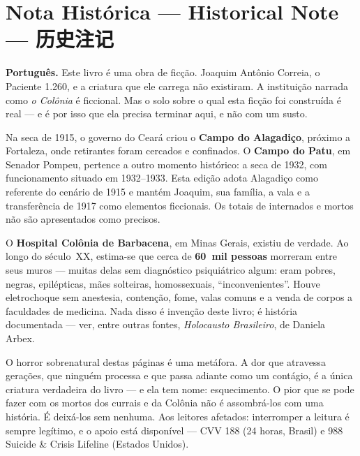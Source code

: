 \cleardoublepage
\chapter*{Nota Histórica --- Historical Note --- 历史注记}
\label{nota-historica}

\thispagestyle{empty}

\noindent\textbf{Português.} Este livro é uma obra de ficção. Joaquim Antônio Correia, o Paciente 1.260, e a criatura que ele carrega não existiram. A instituição narrada como \textit{o Colônia} é ficcional. Mas o solo sobre o qual esta ficção foi construída é real --- e é por isso que ela precisa terminar aqui, e não com um susto.

\vspace{0.6em}
\noindent Na seca de 1915, o governo do Ceará criou o \textbf{Campo do Alagadiço}, próximo a Fortaleza, onde retirantes foram cercados e confinados. O \textbf{Campo do Patu}, em Senador Pompeu, pertence a outro momento histórico: a seca de 1932, com funcionamento situado em 1932--1933. Esta edição adota Alagadiço como referente do cenário de 1915 e mantém Joaquim, sua família, a vala e a transferência de 1917 como elementos ficcionais. Os totais de internados e mortos não são apresentados como precisos.

\vspace{0.6em}
\noindent O \textbf{Hospital Colônia de Barbacena}, em Minas Gerais, existiu de verdade. Ao longo do século~XX, estima-se que cerca de \textbf{60~mil pessoas} morreram entre seus muros --- muitas delas sem diagnóstico psiquiátrico algum: eram pobres, negras, epilépticas, mães solteiras, homossexuais, ``inconvenientes''. Houve eletrochoque sem anestesia, contenção, fome, valas comuns e a venda de corpos a faculdades de medicina. Nada disso é invenção deste livro; é história documentada --- ver, entre outras fontes, \textit{Holocausto Brasileiro}, de Daniela Arbex.

\vspace{0.6em}
\noindent O horror sobrenatural destas páginas é uma metáfora. A dor que atravessa gerações, que ninguém processa e que passa adiante como um contágio, é a única criatura verdadeira do livro --- e ela tem nome: esquecimento. O pior que se pode fazer com os mortos dos currais e da Colônia não é assombrá-los com uma história. É deixá-los sem nenhuma. Aos leitores afetados: interromper a leitura é sempre legítimo, e o apoio está disponível --- CVV 188 (24 horas, Brasil) e 988 Suicide \& Crisis Lifeline (Estados Unidos).

